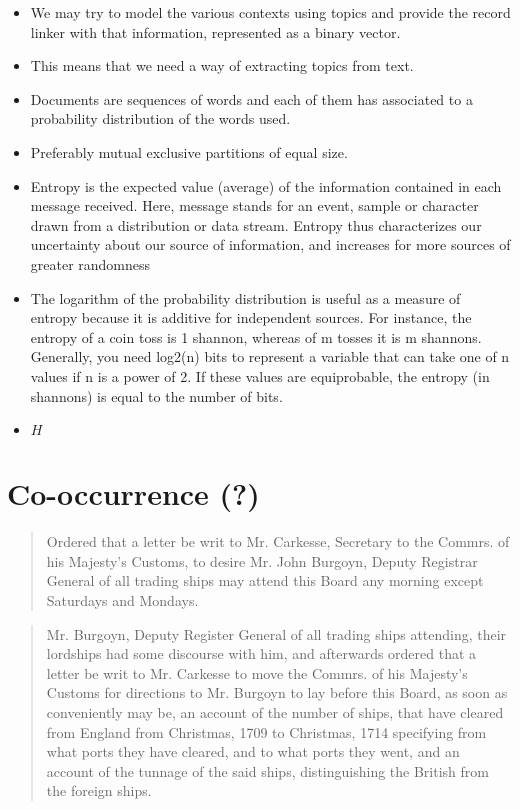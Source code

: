 \begin{itemize}
    \item We may try to model the various contexts using topics and provide the record linker with that information, represented as a binary vector.
    \item This means that we need a way of extracting topics from text.
    \item Documents are sequences of words and each of them has associated to a probability distribution of the words used.
    \item Preferably mutual exclusive partitions of equal size.
    \item Entropy is the expected value (average) of the information contained in each message received. Here, message stands for an event, sample or character drawn from a distribution or data stream. Entropy thus characterizes our uncertainty about our source of information, and increases for more sources of greater randomness
    \item The logarithm of the probability distribution is useful as a measure of entropy because it is additive for independent sources. For instance, the entropy of a coin toss is 1 shannon, whereas of m tosses it is m shannons. Generally, you need log2(n) bits to represent a variable that can take one of n values if n is a power of 2. If these values are equiprobable, the entropy (in shannons) is equal to the number of bits.
    \item $H$
\end{itemize}




\section{Co-occurrence (?)}
\label{sec:co-occurrence}

\begin{quote}
    Ordered that a letter be writ to Mr. Carkesse, Secretary to the Commrs. of his Majesty's Customs, to desire Mr. John Burgoyn, Deputy Registrar General of all trading ships may attend this Board any morning except Saturdays and Mondays.
\end{quote}

\begin{quote}
    Mr. Burgoyn, Deputy Register General of all trading ships attending, their lordships had some discourse with him, and afterwards ordered that a letter be writ to Mr. Carkesse to move the Commrs. of his Majesty's Customs for directions to Mr. Burgoyn to lay before this Board, as soon as conveniently may be, an account of the number of ships, that have cleared from England from Christmas, 1709 to Christmas, 1714 specifying from what ports they have cleared, and to what ports they went, and an account of the tunnage of the said ships, distinguishing the British from the foreign ships.
\end{quote}